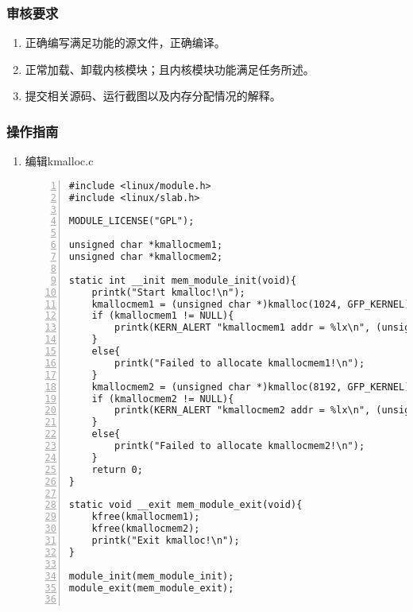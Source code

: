\documentclass{article}
\begin{document}
\subsubsection{审核要求}
\begin{enumerate}
	\item 正确编写满足功能的源文件，正确编译。
	\item 正常加载、卸载内核模块；且内核模块功能满足任务所述。
	\item 提交相关源码、运行截图以及内存分配情况的解释。
\end{enumerate}
\subsubsection{操作指南}
\begin{enumerate}
	\item 编辑kmalloc.c
	      \begin{lstlisting}[numbers=left]
#include <linux/module.h>
#include <linux/slab.h>

MODULE_LICENSE("GPL");

unsigned char *kmallocmem1;
unsigned char *kmallocmem2;

static int __init mem_module_init(void){
	printk("Start kmalloc!\n");
	kmallocmem1 = (unsigned char *)kmalloc(1024, GFP_KERNEL);
	if (kmallocmem1 != NULL){
		printk(KERN_ALERT "kmallocmem1 addr = %lx\n", (unsigned long)kmallocmem1);
	}
	else{
		printk("Failed to allocate kmallocmem1!\n");
	}
	kmallocmem2 = (unsigned char *)kmalloc(8192, GFP_KERNEL);
	if (kmallocmem2 != NULL){
		printk(KERN_ALERT "kmallocmem2 addr = %lx\n", (unsigned long)kmallocmem2);
	}
	else{
		printk("Failed to allocate kmallocmem2!\n");
	}
	return 0;
}

static void __exit mem_module_exit(void){
	kfree(kmallocmem1);
	kfree(kmallocmem2);
	printk("Exit kmalloc!\n");
}

module_init(mem_module_init);
module_exit(mem_module_exit);


\end{lstlisting}
\end{enumerate}
\end{document}
